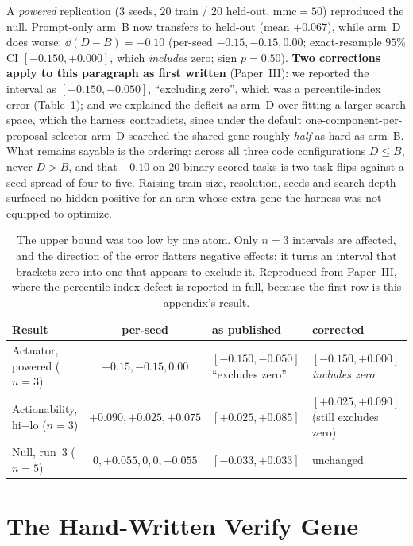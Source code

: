 \documentclass[11pt]{article}
\begin{document}
A \emph{powered} replication ($3$ seeds, $20$ train / $20$ held-out, $\mathrm{mmc}=50$)
reproduced the null. Prompt-only arm~B now transfers to held-out (mean $+0.067$), while arm~D
does worse: $\dd(D-B) = -0.10$ (per-seed $-0.15, -0.15, 0.00$; exact-resample $95\%$ CI
$[-0.150, +0.000]$, which \emph{includes} zero; sign $p = 0.50$). \textbf{Two corrections
apply to this paragraph as first written} (Paper~III): we reported the interval as
$[-0.150,-0.050]$, ``excluding zero'', which was a percentile-index error
(Table~\ref{tab:ciexcl}); and we explained
the deficit as arm~D over-fitting a larger search space, which the harness contradicts, since
under the default one-component-per-proposal selector arm~D searched the shared gene roughly
\emph{half} as hard as arm~B. What remains sayable is the ordering: across all three code
configurations $D \le B$, never $D > B$, and that $-0.10$ on $20$ binary-scored tasks is
two task flips against a seed spread of four to five. Raising train size, resolution, seeds
and search depth surfaced no hidden positive for an arm whose extra gene the harness was not
equipped to optimize.

\begin{table}[h]
\centering
\small
\setlength{\tabcolsep}{5pt}
\begin{tabular}{lcp{}p{}}
\toprule
Result & per-seed & as published & corrected \\
\midrule
Actuator, powered ($n{=}3$) & $-0.15, -0.15, 0.00$ & $[-0.150,-0.050]$ ``excludes zero''
  & $\mathbf{[-0.150,+0.000]}$ \emph{includes zero} \\
Actionability, hi$-$lo ($n{=}3$) & $+0.090, +0.025, +0.075$ & $[+0.025,+0.085]$
  & $[+0.025,+0.090]$ (still excludes zero) \\
Null, run~3 ($n{=}5$) & $0,+0.055,0,0,-0.055$ & $[-0.033,+0.033]$ & unchanged \\
\bottomrule
\end{tabular}
\caption{The upper bound was too low by one atom. Only $n{=}3$ intervals are affected, and
the direction of the error flatters negative effects: it turns an interval that brackets
zero into one that appears to exclude it. Reproduced from Paper~III, where the
percentile-index defect is reported in full, because the first row is this appendix's result.}
\label{tab:ciexcl}
\end{table}

\section{The Hand-Written Verify Gene}
\label{sec:handgene}
\end{document}
